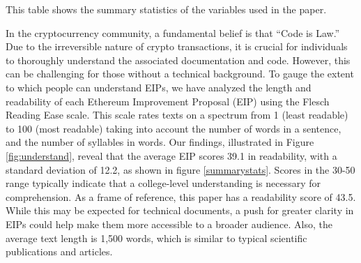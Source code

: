 \documentclass[No]{AEA}
\begin{document}
\begin{table}
    \caption{Summary Statistics}
     \begin{small}
    \begin{minipage}{\textwidth}
      This table shows the summary statistics of the variables used in the paper. 
  \end{minipage}
         \end{small}
    \makebox[\textwidth][c]{}
    \label{summarystats}

\end{table}



In the cryptocurrency community, a fundamental belief is that ``Code is Law.'' Due to the irreversible nature of crypto transactions, it is crucial for individuals to thoroughly understand the associated documentation and code. However, this can be challenging for those without a technical background. To gauge the extent to which people can understand EIPs, we have analyzed the length and readability of each Ethereum Improvement Proposal (EIP) using the Flesch Reading Ease scale. This scale rates texts on a spectrum from 1 (least readable) to 100 (most readable) taking into account the number of words in a sentence, and the number of syllables in words. Our findings, illustrated in Figure \ref{fig:understand}, reveal that the average EIP scores 39.1 in readability, with a standard deviation of 12.2, as shown in figure \ref{summarystats}. Scores in the 30-50 range typically indicate that a college-level understanding is necessary for comprehension. As a frame of reference, this paper has a readability score of 43.5. While this may be expected for technical documents, a push for greater clarity in EIPs could help make them more accessible to a broader audience. Also, the average text length is 1,500 words, which is similar to typical scientific publications and articles. 
\end{document}
